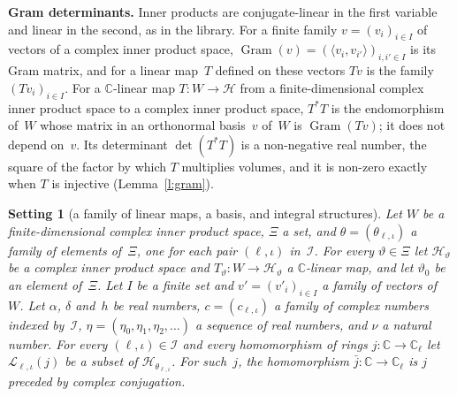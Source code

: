 \documentclass[11pt,a4paper]{article}
\newcommand{\m}[1]{\mbox{$#1$}}        %
\newcommand{\subhead}[1]{\par\addvspace{9pt plus 2pt}\Needspace{4\baselineskip}\noindent\textbf{#1}\enspace\ignorespaces}
\theoremstyle{plainx}
\theoremstyle{uprightx}
\newtheorem{setting}[theorem]{Setting}          %
\newcommand{\CC}{\mathbb{C}}
\newcommand{\Cl}{\mathbb{C}_\ell}
\newcommand{\IX}{\mathcal{I}}
\newcommand{\Hs}{\mathcal{H}}
\newcommand{\Ls}{\mathcal{L}}
\newcommand{\Gram}{\operatorname{Gram}}
\newcommand{\ip}[2]{\langle #1,#2\rangle}
\begin{document}
\subhead{Gram determinants.} Inner products are conjugate-linear in the first variable and linear in the second,
as in the library. For a finite family $v=(v_i)_{i\in I}$ of vectors of a complex inner product space,
\m{\Gram(v)=(\ip{v_i}{v_{i'}})_{i,i'\in I}} is its Gram matrix, and for a linear map~$T$ defined on these vectors
$Tv$ is the family $(Tv_i)_{i\in I}$. For a $\CC$-linear map $T\colon W\to\Hs$ from a finite-dimensional complex inner
product space to a complex inner product space, $T^{*}T$ is the endomorphism of~$W$ whose matrix in an orthonormal
basis~$v$ of~$W$ is $\Gram(Tv)$; it does not depend on~$v$. Its determinant $\det(T^{*}T)$ is a non-negative real
number, the square of the factor by which $T$ multiplies volumes, and it is non-zero exactly when $T$ is injective
(Lemma~\ref{l:gram}).

\begin{setting}[a family of linear maps, a basis, and integral structures]\label{set:gram}
Let $W$ be a finite-dimensional complex inner product space, $\Xi$ a set, and $\theta=(\theta_{\ell,\iota})$ a
family of elements of~$\Xi$, one for each pair $(\ell,\iota)$ in~$\IX$. For every $\vartheta\in\Xi$ let
$\Hs_\vartheta$ be a complex inner product space and \m{T_\vartheta\colon W\to\Hs_\vartheta} a $\CC$-linear map,
and let $\vartheta_0$ be an element of~$\Xi$. Let $I$ be a finite set and $v'=(v'_i)_{i\in I}$ a family of vectors
of~$W$. Let $\alpha$, $\delta$ and~$h$ be real numbers, $c=(c_{\ell,\iota})$ a family of complex numbers indexed
by~$\IX$, $\eta=(\eta_0,\eta_1,\eta_2,\dots)$ a sequence of real numbers, and $\nu$ a natural number. For every
$(\ell,\iota)\in\IX$ and every homomorphism of rings \m{j\colon\CC\to\Cl} let $\Ls_{\ell,\iota}(j)$ be a subset of
$\Hs_{\theta_{\ell,\iota}}$. For such~$j$, the homomorphism \m{\bar j\colon\CC\to\Cl} is $j$ preceded by complex
conjugation.
\end{setting}
\end{document}
